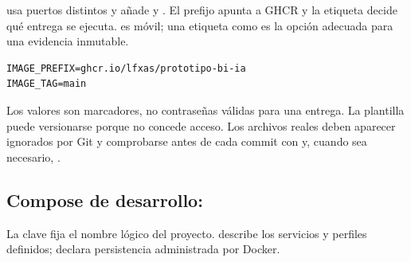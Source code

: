  usa puertos distintos y añade  y . El prefijo apunta a GHCR y la etiqueta decide qué entrega se ejecuta.  es móvil; una etiqueta como  es la opción adecuada para una evidencia inmutable.

\begin{lstlisting}[style=terminal]
IMAGE_PREFIX=ghcr.io/lfxas/prototipo-bi-ia
IMAGE_TAG=main
\end{lstlisting}

Los valores  son marcadores, no contraseñas válidas para una entrega. La plantilla puede versionarse porque no concede acceso. Los archivos reales deben aparecer ignorados por Git y comprobarse antes de cada commit con  y, cuando sea necesario, .

\subsection{Compose de desarrollo: }

La clave  fija el nombre lógico del proyecto.  describe los servicios y perfiles definidos;  declara persistencia administrada por Docker.

